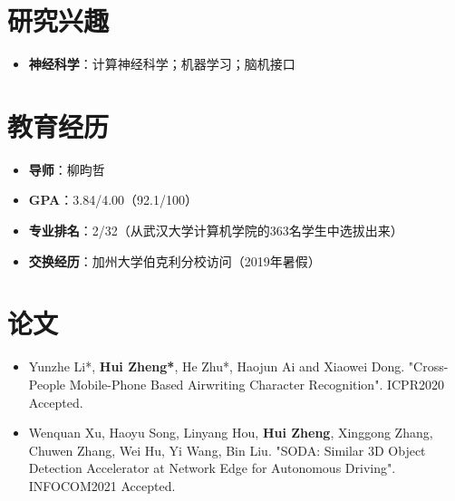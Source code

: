 \documentclass{resume}
\begin{document}
    

\section{{\bfseries 研究兴趣}}
\begin{itemize}[parsep=0.2ex]
\item \textbf{神经科学}：计算神经科学；机器学习；脑机接口
\end{itemize}

\section{{\bfseries 教育经历}}
\begin{itemize}[parsep=0.1ex]
    \item \textbf{导师}：柳昀哲
\end{itemize}
\begin{itemize}[parsep=0.1ex]
    \item \textbf{GPA}：3.84/4.00（92.1/100）
    \item \textbf{专业排名}：2/32（从武汉大学计算机学院的363名学生中选拔出来）
    \item \textbf{交换经历}：加州大学伯克利分校访问（2019年暑假）
\end{itemize}

\section{{\bfseries 论文}}
\begin{itemize}[parsep=0.2ex]
    \item Yunzhe Li*, \textbf{Hui Zheng*}, He Zhu*, Haojun Ai and Xiaowei Dong. "Cross-People Mobile-Phone Based Airwriting Character Recognition". ICPR2020 Accepted.
    \item Wenquan Xu, Haoyu Song, Linyang Hou, \textbf{Hui Zheng}, Xinggong Zhang, Chuwen Zhang, Wei Hu, Yi Wang, Bin Liu. "SODA: Similar 3D Object Detection Accelerator at Network Edge for Autonomous Driving". INFOCOM2021 Accepted.
\end{itemize}
\end{document}
